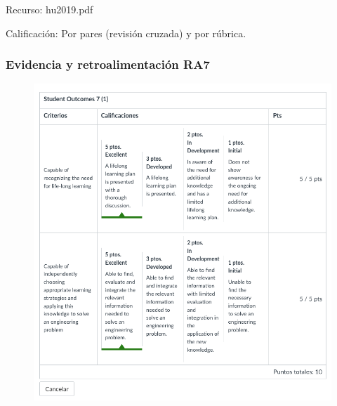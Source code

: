 Recurso: hu2019.pdf

Calificación:  Por pares (revisión cruzada) y por rúbrica. 

\subsubsection{Evidencia y retroalimentación RA7}
\begin{figure}[htbp]
    \centering
    \includegraphics[width=\textwidth]{recursos/ra7/ra7-re.png}
\end{figure}

